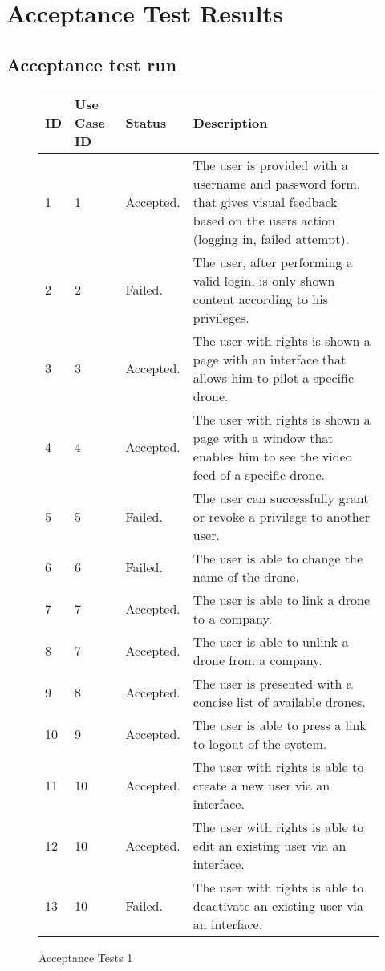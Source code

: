 \chapter{Acceptance Test Results}
\label{appendix:acceptance_test_results}

\section{Acceptance test run}
\begin{figure}[htb]
\begin{center}
\begin{tabular}{ | l | l | l | p{8cm} | }
  \hline
	\textbf{ID} & \textbf{Use Case ID} & \textbf{Status} & \textbf{Description} \\ \hline
	1 & 1 & Accepted. & The user is provided with a username and password form, that gives visual feedback based on the users action (logging in, failed attempt).\\ \hline
	2 & 2 & Failed. & The user, after performing a valid login, is only shown content according to his privileges. \\ \hline
	3 & 3 & Accepted. & The user with rights is shown a page with an interface that allows him to pilot a specific drone.\\ \hline
	4 & 4 & Accepted. & The user with rights is shown a page with a window that enables him to see the video feed of a specific drone. \\ \hline
	5 & 5 & Failed. & The user can successfully grant or revoke a privilege to another user. \\ \hline
	6 & 6 & Failed. & The user is able to change the name of the drone. \\ \hline
	7 & 7 & Accepted. & The user is able to link a drone to a company.\\ \hline
	8 & 7 & Accepted. & The user is able to unlink a drone from a company.  \\ \hline
	9 & 8 & Accepted. & The user is presented with a concise list of available drones.  \\ \hline
	10 & 9 & Accepted. & The user is able to press a link to logout of the system.  \\ \hline
	11 & 10 & Accepted. & The user with rights is able to create a new user via an interface.  \\ \hline
	12 & 10 & Accepted. & The user with rights is able to edit an existing user via an interface.  \\ \hline
	13 & 10 & Failed. & The user with rights is able to deactivate an existing user via an interface.  \\
	
  \hline
\end{tabular}
\caption{Acceptance Tests 1}
\label{tab:acceptance_tests1}
\end{center}
\end{figure}

